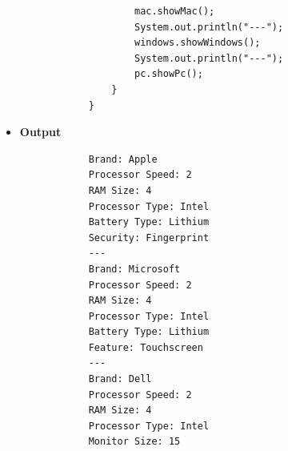 \documentclass[12pt,titlepage]{article}
\begin{document}
\begin{itemize}
{\begin{verbatim}
                    mac.showMac();
                    System.out.println("---");
                    windows.showWindows();
                    System.out.println("---");
                    pc.showPc();
                }
            }
        \end{verbatim}
    }
    \item {
        \textbf{Output}
        \begin{verbatim}
            Brand: Apple
            Processor Speed: 2
            RAM Size: 4
            Processor Type: Intel
            Battery Type: Lithium
            Security: Fingerprint
            ---
            Brand: Microsoft
            Processor Speed: 2
            RAM Size: 4
            Processor Type: Intel
            Battery Type: Lithium
            Feature: Touchscreen
            ---
            Brand: Dell
            Processor Speed: 2
            RAM Size: 4
            Processor Type: Intel
            Monitor Size: 15
        \end{verbatim}
    }
\end{itemize}
\end{document}
